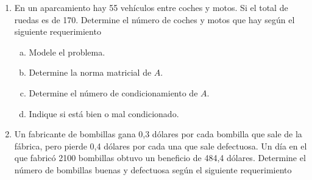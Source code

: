 \documentclass[
	spanish,
	8pt,
	utf8,
	xcolor=table,
	handout,
	aspectratio=169,
	professionalfonts,
	notheorems,
	mathserif,
]{beamer}
\begin{document}
\begin{frame}
\begin{enumerate}
\begin{multicols}{3}
\begin{enumerate}[a)]
				      \item

				            \begin{math}
					            f\left(x\right)=
					            \sqrt{x}
				            \end{math},
				            con $n=1$.


				      \item

				            \begin{math}
					            f\left(x_{1},x_{2}\right)=x_{1}\cdot x_{2}
				            \end{math},
				            con $n=2$.
			      \end{enumerate}
		      \end{multicols}

		      Determine el número de condición.

		\item

		      En un aparcamiento hay 55 vehículos entre coches y motos.
		      Si el total de ruedas es de 170.
		      Determine el número de coches y motos que hay según el
		      siguiente requerimiento

		      \begin{multicols}{2}
			      \begin{enumerate}[a)]

				      \item

				            Modele el problema.

				      \item

				            Determine la norma matricial de $A$.


				      \item

				            Determine el número de condicionamiento de $A$.

				      \item

				            Indique si está bien o mal condicionado.
			      \end{enumerate}
		      \end{multicols}

		\item

		      Un fabricante de bombillas gana 0,3 dólares por cada
		      bombilla que sale de la fábrica, pero pierde 0,4 dólares
		      por cada una que sale defectuosa.
		      Un día en el que fabricó 2100 bombillas obtuvo un beneficio
		      de 484,4 dólares.
		      Determine el número de bombillas buenas y defectuosa según
		      el siguiente requerimiento


\end{enumerate}
\end{frame}
\end{document}
